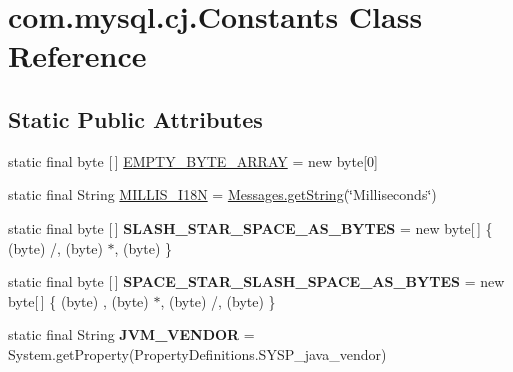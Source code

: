 \hypertarget{classcom_1_1mysql_1_1cj_1_1_constants}{}\section{com.\+mysql.\+cj.\+Constants Class Reference}
\label{classcom_1_1mysql_1_1cj_1_1_constants}
\subsection*{Static Public Attributes}
\begin{DoxyCompactItemize}
\item 
static final byte \mbox{[}$\,$\mbox{]} \mbox{\hyperlink{classcom_1_1mysql_1_1cj_1_1_constants_abc80f5c092cffb1a8a0f80f19e9eacf1}{E\+M\+P\+T\+Y\+\_\+\+B\+Y\+T\+E\+\_\+\+A\+R\+R\+AY}} = new byte\mbox{[}0\mbox{]}
\item 
static final String \mbox{\hyperlink{classcom_1_1mysql_1_1cj_1_1_constants_a8fc1f3a520cd5d66593984337c90ce3a}{M\+I\+L\+L\+I\+S\+\_\+\+I18N}} = \mbox{\hyperlink{classcom_1_1mysql_1_1cj_1_1_messages_a86a388448aa7759254c491b3e1320d31}{Messages.\+get\+String}}(\char`\"{}Milliseconds\char`\"{})
\item 
\mbox{\label{classcom_1_1mysql_1_1cj_1_1_constants_afebd0fbda69fa22898d79cab16aaadb5}} 
static final byte \mbox{[}$\,$\mbox{]} {\bfseries S\+L\+A\+S\+H\+\_\+\+S\+T\+A\+R\+\_\+\+S\+P\+A\+C\+E\+\_\+\+A\+S\+\_\+\+B\+Y\+T\+ES} = new byte\mbox{[}$\,$\mbox{]} \{ (byte) \textquotesingle{}/\textquotesingle{}, (byte) \textquotesingle{}$\ast$\textquotesingle{}, (byte) \textquotesingle{} \textquotesingle{} \}
\item 
\mbox{\label{classcom_1_1mysql_1_1cj_1_1_constants_a0a96e131511732ac611127cb21b1e0c3}} 
static final byte \mbox{[}$\,$\mbox{]} {\bfseries S\+P\+A\+C\+E\+\_\+\+S\+T\+A\+R\+\_\+\+S\+L\+A\+S\+H\+\_\+\+S\+P\+A\+C\+E\+\_\+\+A\+S\+\_\+\+B\+Y\+T\+ES} = new byte\mbox{[}$\,$\mbox{]} \{ (byte) \textquotesingle{} \textquotesingle{}, (byte) \textquotesingle{}$\ast$\textquotesingle{}, (byte) \textquotesingle{}/\textquotesingle{}, (byte) \textquotesingle{} \textquotesingle{} \}
\item 
\mbox{\label{classcom_1_1mysql_1_1cj_1_1_constants_a0922e1d682357da9d24654920bbf141f}} 
static final String {\bfseries J\+V\+M\+\_\+\+V\+E\+N\+D\+OR} = System.\+get\+Property(Property\+Definitions.\+S\+Y\+S\+P\+\_\+java\+\_\+vendor)

\end{DoxyCompactItemize}
